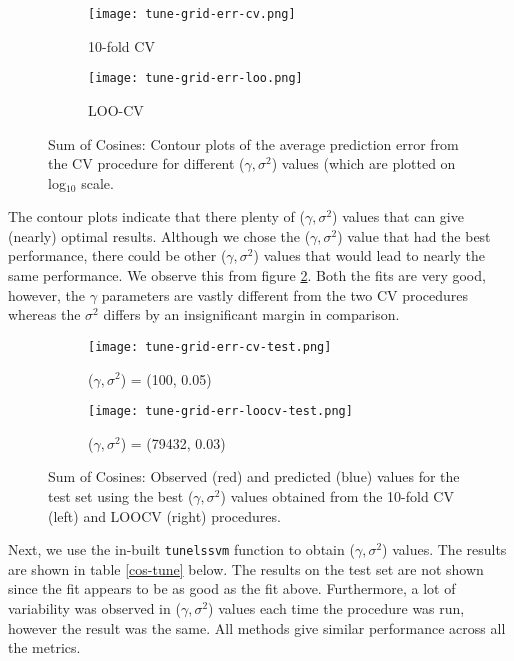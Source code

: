 \documentclass[paper=a4, fontsize=11pt]{scrartcl} %
\numberwithin{equation}{section} %
\begin{document}
\begin{figure}[ht]
\centering
	\begin{subfigure}[b]{0.5\textwidth}
		\centering
		\texttt{[image: tune-grid-err-cv.png]}
		\caption{10-fold CV}
	\end{subfigure}%
	\begin{subfigure}[b]{0.5\textwidth}
		\centering
		\texttt{[image: tune-grid-err-loo.png]}
		\caption{LOO-CV}
	\end{subfigure}
\caption{Sum of Cosines: Contour plots of the average prediction error from the CV procedure for different ($\gamma, \sigma^2$) values (which are plotted on log$_{10}$ scale.}
\label{tune-grid-contour}
\end{figure}

The contour plots indicate that there plenty of ($\gamma, \sigma^2$) values that can give (nearly) optimal results. Although we chose the ($\gamma, \sigma^2$) value that had the best performance, there could be other ($\gamma, \sigma^2$) values that would lead to nearly the same performance. We observe this from figure \ref{tune-grid-test}. Both the fits are very good, however, the $\gamma$ parameters are vastly different from the two CV procedures whereas the $\sigma^2$ differs by an insignificant margin in comparison.\\

\begin{figure}[ht]
\centering
	\begin{subfigure}[b]{0.5\textwidth}
		\centering
		\texttt{[image: tune-grid-err-cv-test.png]}
		\caption{($\gamma, \sigma^2$) = (100, 0.05)}
	\end{subfigure}%
	\begin{subfigure}[b]{0.5\textwidth}
		\centering
		\texttt{[image: tune-grid-err-loocv-test.png]}
		\caption{($\gamma, \sigma^2$) = (79432, 0.03)}
	\end{subfigure}
\caption{Sum of Cosines: Observed (red) and predicted (blue) values for the test set using the best ($\gamma, \sigma^2$) values obtained from the 10-fold CV (left) and LOOCV (right) procedures.}
\label{tune-grid-test}
\end{figure}

Next, we use the in-built \texttt{tunelssvm} function to obtain ($\gamma, \sigma^2$) values. The results are shown in table \ref{cos-tune} below. The results on the test set are not shown since the fit appears to be as good as the fit above. Furthermore, a lot of variability was observed in ($\gamma, \sigma^2$) values each time the procedure was run, however the result was the same. All methods give similar performance across all the metrics.
\end{document}
